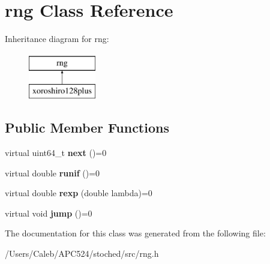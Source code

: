 \hypertarget{classrng}{}\section{rng Class Reference}
\label{classrng}
Inheritance diagram for rng\+:\begin{figure}[H]
\begin{center}
\leavevmode
\includegraphics[height=2.000000cm]{classrng}
\end{center}
\end{figure}
\subsection*{Public Member Functions}
\begin{DoxyCompactItemize}
\item 
\mbox{\label{classrng_a0fa7d2415b07e3396b6ed3fb7c238606}} 
virtual uint64\+\_\+t {\bfseries next} ()=0
\item 
\mbox{\label{classrng_a3f0fec3ad9a286726825fddbf78aada8}} 
virtual double {\bfseries runif} ()=0
\item 
\mbox{\label{classrng_aaeb35f3da862b3b94fef89da967bb337}} 
virtual double {\bfseries rexp} (double lambda)=0
\item 
\mbox{\label{classrng_a2203fb1d2504c000306be5a0035d1a6c}} 
virtual void {\bfseries jump} ()=0
\end{DoxyCompactItemize}


The documentation for this class was generated from the following file\+:\begin{DoxyCompactItemize}
\item 
/\+Users/\+Caleb/\+A\+P\+C524/stoched/src/rng.\+h\end{DoxyCompactItemize}
